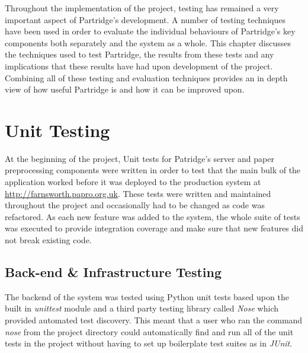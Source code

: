 %  
%

Throughout the implementation of the project, testing has remained a very
important aspect of Partridge's development. A number of testing techniques
have been used in order to evaluate the individual behaviours of Partridge's
key components both separately and the system as a whole. This chapter
discusses the techniques used to test Partridge, the results from these tests
and any implications that these results have had upon development of the
project. Combining all of these testing and evaluation techniques provides an
in depth view of how useful Partridge is and how it can be improved upon.

\section{ Unit Testing }

At the beginning of the project, Unit tests for Patridge's server and paper
preprocessing components were written in order to test that the main bulk of
the application worked before it was deployed to the production system at
\url{http://farnsworth.papro.org.uk}. These tests were written and maintained
throughout the project and occasionally had to be changed as code was
refactored. As each new feature was added to the system, the whole suite of
tests was executed to provide integration coverage and make sure that new
features did not break existing code. 

\subsection{ Back-end \& Infrastructure Testing}

The backend of the system was tested using Python unit tests based upon the
built in \emph{unittest} module and a third party testing library called
\emph{Nose} which provided automated test discovery. This meant that a user who
ran the command \emph{nose} from the project directory could automatically find
and run all of the unit tests in the project without having to set up
boilerplate test suites as in \emph{JUnit}.

